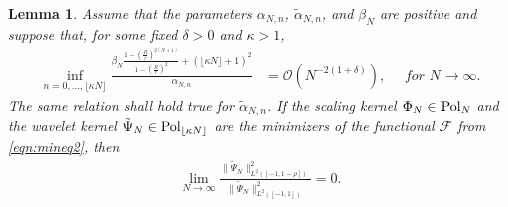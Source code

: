 \documentclass[a4paper, 10pt]{article}
\numberwithin{equation}{section}
\newtheorem{lem}[thm]{Lemma}
\theoremstyle{definition}
\begin{document}
\begin{lem}\label{lem:loc}
Assume that the parameters $\alpha_{N,n}$, $\tilde{\alpha}_{N,n}$, and $\beta_N$ are positive and suppose that, for some fixed $\delta>0$ and $\kappa>1$,
\begin{align}
\inf_{n=0,\ldots, \lfloor\kappa N\rfloor}\frac{\beta_N\frac{1-\left(\frac{R}{r}\right)^{2(N+1)}}{1-\left(\frac{R}{r}\right)^2}+( \lfloor\kappa N\rfloor+1)^2}{{\alpha}_{N,n}}&=\mathcal{O}\left(N^{-2(1+\delta)}\right),\quad \textit{ for }N\to\infty.\label{eqn:ass11}
\end{align}
The same relation shall hold true for $\tilde{\alpha}_{N,n}$. If the scaling kernel $\Phi_N\in\textnormal{Pol}_{N}$ and the wavelet kernel $\tilde{\Psi}_N\in\textnormal{Pol}_{\lfloor\kappa N\rfloor}$ are the minimizers of the functional $\mathcal{F}$ from \eqref{eqn:mineq2}, then
\begin{align} \label{eqn:optloc2}
\lim_{N\to\infty}
\frac{\big\|\tilde{\Psi}_N\big\|^2_{L^2([-1,1-\rho])}}{\big\|\tilde{\Psi}_N\big\|^2_{L^2([-1,1])}}=0.
\end{align}
\end{lem}
\end{document}

